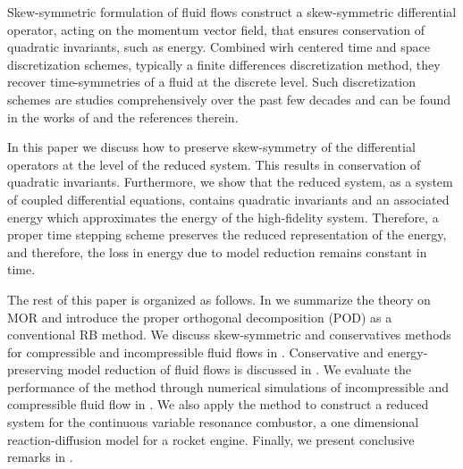 Skew-symmetric formulation of fluid flows construct a skew-symmetric differential operator, acting on the momentum vector field, that ensures conservation of quadratic invariants, such as energy. Combined wirh centered time and space discretization schemes, typically a finite differences discretization method, they recover time-symmetries of a fluid at the discrete level. Such discretization schemes are studies comprehensively over the past few decades and can be found in the works of \cite{morinishi2010skew,morinishi1998fully,desjardins2008high,reiss2014conservative,reiss2014conservative} and the references therein.

In this paper we discuss how to preserve skew-symmetry of the differential operators at the level of the reduced system. This results in conservation of quadratic invariants. Furthermore, we show that the reduced system, as a system of coupled differential equations, contains quadratic invariants and an associated energy which approximates the energy of the high-fidelity system. Therefore, a proper time stepping scheme preserves the reduced representation of the energy, and therefore, the loss in energy due to model reduction remains constant in time.

The rest of this paper is organized as follows. In  we summarize the theory on MOR and introduce the proper orthogonal decomposition (POD) as a conventional RB method. We discuss skew-symmetric and conservatives methods for compressible and incompressible fluid flows in . Conservative and energy-preserving model reduction of fluid flows is discussed in . We evaluate the performance of the method through numerical simulations of incompressible and compressible fluid flow in . We also apply the method to construct a reduced system for the continuous variable resonance combustor, a one dimensional reaction-diffusion model for a rocket engine. Finally, we present conclusive remarks in .
